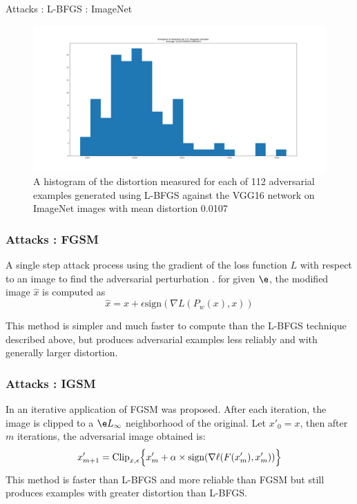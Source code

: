 \begin{frame}{Attacks : L-BFGS : ImageNet}
    \begin{figure}[H]
\label{lbfgsi}
\includegraphics[trim=200 80 100 100, clip,width=12cm]{2019-04-10-adverse/imnet_examples/distortion_hist.png}
\caption{A histogram of the distortion measured for each of 112 adversarial examples generated using L-BFGS against the VGG16 network on ImageNet images with mean distortion 0.0107}
\end{figure}
\end{frame}

\begin{frame}
\frametitle{Attacks : FGSM}
A single step attack process using the gradient of the loss function $L$ with respect to an image to find the adversarial perturbation \cite{goodfellow_explaining_2014}. for given $\e$, the modified image $\hat x$ is computed as
\begin{equation}
\hat{x} = x + \epsilon \text{sign} (\nabla L (P_w(x),x))
\end{equation}

This method is simpler and much faster to compute than the L-BFGS technique described above, but produces adversarial examples less reliably and with generally larger distortion.

\end{frame}

\begin{frame}
\frametitle{Attacks : IGSM}
In \cite{kurakin_adversarial_2016}
  an iterative application of FGSM was proposed. After each
  iteration, the image is clipped to a $\e L_\infty$ neighborhood of the original. Let $x'_0 = x$, then after $m$ iterations, the adversarial image obtained is:
\begin{equation}
x_{m+1}' = \text{Clip}_{x,\epsilon} \Bigl\{x_m' + \alpha \times \text{sign}(\nabla \ell (F(x'_m),x'_m))  \Bigr\} 
\label{igsm}
\end{equation}
This method is faster than L-BFGS and more reliable than FGSM but still produces examples with greater distortion than L-BFGS. 
\end{frame}

